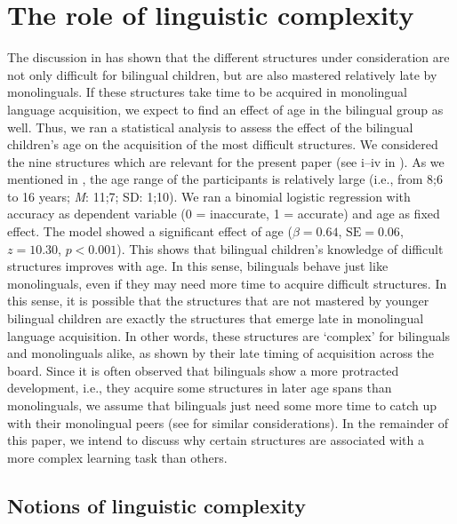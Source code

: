 \documentclass[output=paper]{langscibook}
\begin{document}
\pagebreak
\section{The role of linguistic complexity}\label{sec:rinke:4}

The discussion in  has shown that the different structures under consideration are not only difficult for bilingual children, but are also mastered relatively late by monolinguals. If these structures take time to be acquired in monolingual language acquisition, we expect to find an effect of age in the bilingual group as well. Thus, we ran a statistical analysis to assess the effect of the bilingual children's age on the acquisition of the most difficult structures. We considered the nine structures which are relevant for the present paper (see i--iv in ). As we mentioned in , the age range of the participants is relatively large (i.e., from 8;6 to 16 years; \textit{M}: 11;7; SD: 1;10). We ran a binomial logistic regression with accuracy as dependent variable (0 = inaccurate, 1 = accurate) and age as fixed effect. The model showed a significant effect of age ($\beta = 0.64$, $\text{SE} = 0.06$, $z = 10.30$, $p < 0.001$). This shows that bilingual children’s knowledge of difficult structures improves with age. In this sense, bilinguals behave just like monolinguals, even if they may need more time to acquire difficult structures. In this sense, it is possible that the structures that are not mastered by younger bilingual children are exactly the structures that emerge late in monolingual language acquisition. In other words, these structures are ‘complex’ for bilinguals and monolinguals alike, as shown by their late timing of acquisition across the board. Since it is often observed that bilinguals show a more protracted development, i.e., they acquire some structures in later age spans than monolinguals, we assume that bilinguals just need some more time to catch up with their monolingual peers (see \citealt{SchulzGrimm2019, Tsimpli2014} for similar considerations). In the remainder of this paper, we intend to discuss why certain structures are associated with a more complex learning task than others.

\subsection{Notions of linguistic complexity}\label{sec:rinke:4.1}\largerpage
\end{document}
